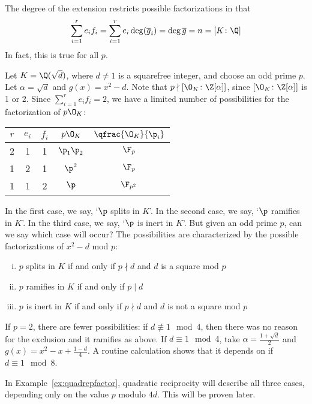 \begin{rem}
The degree of the extension restricts possible factorizations in that
	\[
	\sum_{i=1}^r e_if_i = \sum_{i=1}^r e_i \deg(\overline{g}_i) = \deg \overline{g} = n = [K \colon \Q]
	\]
In fact, this is true for all $p$. 
\end{rem}


\begin{ex}\label{ex:quadrepfactor}
Let $K=\Q(\sqrt{d})$, where $d \neq 1$ is a squarefree integer, and choose an odd prime $p$. Let $\alpha=\sqrt{d}$ and $g(x)=x^2-d$. Note that $p \nmid [\O_K \colon \Z[\alpha]]$, since $[\O_K \colon \Z[\alpha]]$ is 1 or 2. Since $\sum_{i=1}^r e_if_i=2$, we have a limited number of possibilities for the factorization of $p\O_K$:
	\begin{table}[H]
	\centering
	\begin{tabular}{c|c|c|c|c}
	$r$ & $e_i$ & $f_i$ & $p\O_K$ & $\qfrac{\O_K}{\p_i}$ \\ \hline 
	2 & 1 & 1 & $\p_1\p_2$ & $\F_p$  \\
	1 & 2 & 1 & $\p^2$ & $\F_p$ \\
	1 & 1 & 2 & $\p$ & $\F_{p^2}$
	\end{tabular}
	\end{table}
In the first case, we say, `$\p$ splits in $K$'. In the second case, we say, `$\p$ ramifies in $K$'. In the third case, we say, `$\p$ is inert in $K$'. But given an odd prime $p$, can we say which case will occur? The possibilities are characterized by the possible factorizations of $x^2-d$ mod $p$:
	\begin{enumerate}[(i)]
	\item $p$ splits in $K$ if and only if $p\nmid d$ and $d$ is a square mod $p$
	\item $p$ ramifies in $K$ if and only if $p \mid d$
	\item $p$ is inert in $K$ if and only if $p \nmid d$ and $d$ is not a square mod $p$ 
	\end{enumerate}
If $p=2$, there are fewer possibilities: if $d \not\equiv 1 \mod 4$, then there was no reason for the exclusion and it ramifies as above. If $d \equiv 1 \mod 4$, take $\alpha=\frac{1+\sqrt{d}}{2}$ and $g(x)= x^2 - x + \frac{1-d}{4}$. A routine calculation shows that it depends on if $d \equiv 1 \mod 8$. \xqed
\end{ex}


\begin{rem}
In Example~\ref{ex:quadrepfactor}, quadratic reciprocity will describe all three cases, depending only on the value $p$ modulo $4d$. This will be proven later. 
\end{rem}

